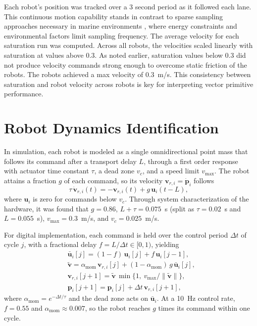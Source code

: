 Each robot's position was tracked over a 3 second period as it followed
each lane. This continuous motion capability stands in contrast to sparse
sampling approaches necessary in marine environments \cite{46}, where
energy constraints and environmental factors limit sampling frequency.
The average velocity for each saturation run was computed. Across all
robots, the velocities scaled linearly with saturation at values above
0.3. As noted earlier, saturation values below 0.3 did not produce
velocity commands strong enough to overcome static friction of the
robots. The robots achieved a max velocity of 0.3~m/s. This consistency
between saturation and robot velocity across robots is key for
interpreting vector primitive performance.

\section{Robot Dynamics Identification}
\label{sec:ch2:dynamics}

In simulation, each robot is modeled as a single omnidirectional point mass that follows its command after a transport delay $L$, through a first order response with actuator time constant $\tau$, a dead zone $v_c$, and a speed limit $v_{\max}$. The robot attains a fraction $g$ of each command, so its velocity $\mathbf{v}_{r,i} = \dot{\mathbf{p}}_i$ follows
\begin{equation}
    \tau\,\dot{\mathbf{v}}_{r,i}(t) = -\mathbf{v}_{r,i}(t) + g\,\mathbf{u}_i(t - L),
    \label{eq:ch2:continuous}
\end{equation}
where $\mathbf{u}_i$ is zero for commands below $v_c$. Through system characterization of the hardware, it was found that $g = 0.86$, $L + \tau = 0.075$~s (split as $\tau = 0.02$~s and $L = 0.055$~s), $v_{\max} = 0.3$~m/s, and $v_c = 0.025$~m/s.

For digital implementation, each command is held over the control period $\Delta t$ of cycle $j$, with a fractional delay $f = L/\Delta t \in [0, 1)$, yielding
\begin{equation}\label{eq:ch2:momentum}
\begin{split}
&\bar{\mathbf{u}}_i[j] = (1-f)\,\mathbf{u}_i[j] + f\,\mathbf{u}_i[j-1],\\
&\tilde{\mathbf{v}} = \alpha_{\text{mom}}\,\mathbf{v}_{r,i}[j] + (1-\alpha_{\text{mom}})\,g\,\bar{\mathbf{u}}_i[j],\\
&\mathbf{v}_{r,i}[j+1] = \tilde{\mathbf{v}}\,\min\{1,\ v_{\max}/\|\tilde{\mathbf{v}}\|\},\\
&\mathbf{p}_i[j+1] = \mathbf{p}_i[j] + \Delta t\,\mathbf{v}_{r,i}[j+1],
\end{split}
\end{equation}
where $\alpha_{\text{mom}} = e^{-\Delta t/\tau}$ and the dead zone acts on $\bar{\mathbf{u}}_i$. At a 10~Hz control rate, $f = 0.55$ and $\alpha_{\text{mom}} \approx 0.007$, so the robot reaches $g$ times its command within one cycle.

